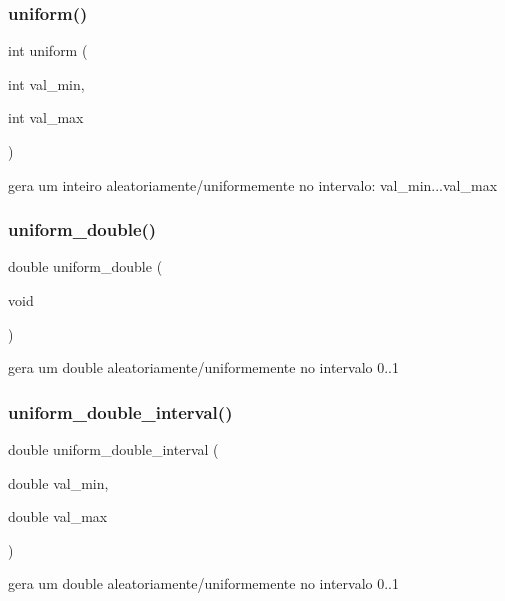 \subsubsection{uniform()}
{\footnotesize\ttfamily int uniform (\begin{DoxyParamCaption}\item[{int}]{val\+\_\+min,  }\item[{int}]{val\+\_\+max }\end{DoxyParamCaption})}



gera um inteiro aleatoriamente/uniformemente no intervalo\+: val\+\_\+min...val\+\_\+max 

\label{lib__util_8c_ae71ab2f0c99295c1d34ca63a0d528582} 
\subsubsection{uniform\+\_\+double()}
{\footnotesize\ttfamily double uniform\+\_\+double (\begin{DoxyParamCaption}\item[{void}]{ }\end{DoxyParamCaption})}



gera um double aleatoriamente/uniformemente no intervalo 0..1 

\label{lib__util_8c_a7ba1451d0da2635a229e7a38c8cb855f} 
\subsubsection{uniform\+\_\+double\+\_\+interval()}
{\footnotesize\ttfamily double uniform\+\_\+double\+\_\+interval (\begin{DoxyParamCaption}\item[{double}]{val\+\_\+min,  }\item[{double}]{val\+\_\+max }\end{DoxyParamCaption})}



gera um double aleatoriamente/uniformemente no intervalo 0..1 

\label{lib__util_8c_a9b94966f5987d3980e36efcd8398f95f} 

